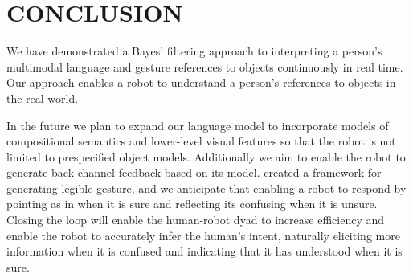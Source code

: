 \documentclass[letterpaper, 10 pt, conference]{ieeeconf}
\begin{document}
\section{CONCLUSION}

We have demonstrated a Bayes' filtering approach to interpreting a
person's multimodal language and gesture references to objects
continuously in real time.  Our approach enables a robot to understand
a person's references to objects in the real world.

In the future we plan to expand our language model to incorporate
models of compositional semantics and lower-level visual features so
that the robot is not limited to prespecified object models.
Additionally we aim to enable the robot to generate back-channel
feedback based on its model.  \citet{dragan13} created a framework for
generating legible gesture, and we anticipate that enabling a robot
to respond by pointing as in \citet{holladay14} when it is sure and
reflecting its confusing when it is unsure.  Closing the loop will
enable the human-robot dyad to increase efficiency and enable the
robot to accurately infer the human's intent, naturally eliciting more
information when it is confused and indicating that it has understood
when it is sure.




\end{document}
